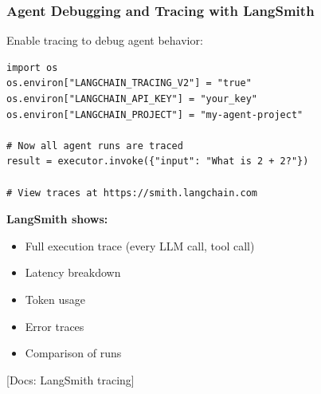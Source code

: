 \documentclass[aspectratio=169,11pt]{beamer}
\newcommand{\docref}[1]{{\scriptsize\color{docgray}[Docs: #1]}}
\begin{document}
\begin{frame}[fragile]
\frametitle{Agent Debugging and Tracing with LangSmith}

Enable tracing to debug agent behavior:

\begin{lstlisting}
import os
os.environ["LANGCHAIN_TRACING_V2"] = "true"
os.environ["LANGCHAIN_API_KEY"] = "your_key"
os.environ["LANGCHAIN_PROJECT"] = "my-agent-project"

# Now all agent runs are traced
result = executor.invoke({"input": "What is 2 + 2?"})

# View traces at https://smith.langchain.com
\end{lstlisting}

\vspace{0.5cm}

\textbf{LangSmith shows:}
\begin{itemize}
  \item Full execution trace (every LLM call, tool call)
  \item Latency breakdown
  \item Token usage
  \item Error traces
  \item Comparison of runs
\end{itemize}

\docref{LangSmith tracing}

\end{frame}
\end{document}
